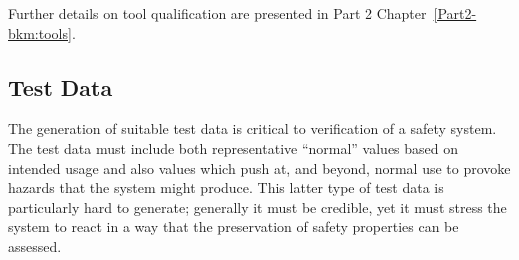 

Further details on tool qualification are presented in Part 2 Chapter~\ref*{Part2-bkm:tools}.

\subsection{Test Data}
The generation of suitable test data is critical to verification of a safety system. The test data must include both representative ``normal'' values based on intended usage and also values which push at, and beyond, normal use to provoke \glspl{hazard} that the system might produce. This latter type of test data is particularly hard to generate; generally it must be credible, yet it must stress the system to react in a way that the preservation of safety properties can be assessed. 

